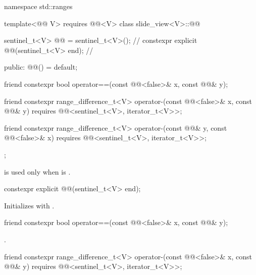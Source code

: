 %
\begin{codeblock}
namespace std::ranges {
  template<@@ V>
    requires @@<V>
  class slide_view<V>::@@ {
    sentinel_t<V> @@ = sentinel_t<V>();             // \expos
    constexpr explicit @@(sentinel_t<V> end);   // \expos

  public:
    @@() = default;

    friend constexpr bool operator==(const @@<false>& x, const @@& y);

    friend constexpr range_difference_t<V>
      operator-(const @@<false>& x, const @@& y)
        requires @@<sentinel_t<V>, iterator_t<V>>;

    friend constexpr range_difference_t<V>
      operator-(const @@& y, const @@<false>& x)
        requires @@<sentinel_t<V>, iterator_t<V>>;
  };
}
\end{codeblock}

\pnum
\begin{note}
 is used
only when  is .
\end{note}

\begin{itemdecl}
constexpr explicit @@(sentinel_t<V> end);
\end{itemdecl}

\begin{itemdescr}
\pnum
\effects
Initializes  with .
\end{itemdescr}

\begin{itemdecl}
friend constexpr bool operator==(const @@<false>& x, const @@& y);
\end{itemdecl}

\begin{itemdescr}
\pnum
\returns
{}.
\end{itemdescr}

\begin{itemdecl}
friend constexpr range_difference_t<V>
  operator-(const @@<false>& x, const @@& y)
    requires @@<sentinel_t<V>, iterator_t<V>>;
\end{itemdecl}


